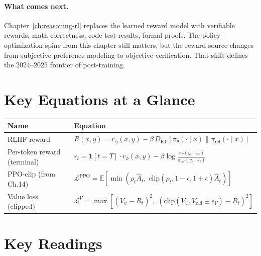 \paragraph{What comes next.} Chapter~\ref{ch:reasoning-rl} replaces the learned reward model with verifiable rewards: math correctness, code test results, formal proofs. The policy-optimization spine from this chapter still matters, but the reward source changes from subjective preference modeling to objective verification. That shift defines the 2024--2025 frontier of post-training.


\section*{Key Equations at a Glance}

\begin{center}
\begin{tabularx}{\textwidth}{@{}lX@{}}
\toprule
\textbf{Name} & \textbf{Equation} \\
\midrule
RLHF reward & $R(x, y) = r_\phi(x, y) - \beta \, D_{\text{KL}}[\pi_\theta(\cdot \mid x) \| \pi_{\text{ref}}(\cdot \mid x)]$ \\[6pt]
Per-token reward (terminal) & $r_t = \mathbf{1}[t{=}T] \cdot r_\phi(x,y) - \beta \log \frac{\pi_\theta(y_t \mid s_t)}{\pi_{\text{ref}}(y_t \mid s_t)}$ \\[6pt]
PPO-clip (from Ch.14) & $\mathcal{L}^{\text{PPO}} = \mathbb{E}\left[\min\left(\rho_t \hat{A}_t, \; \text{clip}(\rho_t, 1{-}\epsilon, 1{+}\epsilon) \hat{A}_t\right)\right]$ \\[6pt]
Value loss (clipped) & $\mathcal{L}^{V} = \max\!\left[(V_\psi - R_t)^2, \;(\text{clip}(V_\psi, V_{\text{old}} \pm \epsilon_V) - R_t)^2\right]$ \\
\bottomrule
\end{tabularx}
\end{center}


\section*{Key Readings}

